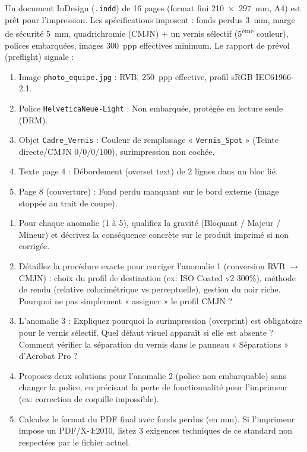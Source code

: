 \documentclass[11pt]{article}
\begin{document}
\begin{exercice}
Un document InDesign (\texttt{.indd}) de 16 pages (format fini \SI{210 x 297}{\milli\meter}, A4) est prêt pour l'impression. Les spécifications imposent : fonds perdus \SI{3}{\milli\meter}, marge de sécurité \SI{5}{\milli\meter}, quadrichromie (CMJN) + un vernis sélectif (5\textsuperscript{ème} couleur), polices embarquées, images \SI{300}{ppp} effectives minimum. Le rapport de prévol (preflight) signale :
\begin{enumerate}
    \item Image \texttt{photo\_equipe.jpg} : RVB, \SI{250}{ppp} effective, profil sRGB IEC61966-2.1.
    \item Police \texttt{HelveticaNeue-Light} : Non embarquée, protégée en lecture seule (DRM).
    \item Objet \texttt{Cadre\_Vernis} : Couleur de remplissage « \texttt{Vernis\_Spot} » (Teinte directe/CMJN 0/0/0/100), surimpression non cochée.
    \item Texte page 4 : Débordement (overset text) de 2 lignes dans un bloc lié.
    \item Page 8 (couverture) : Fond perdu manquant sur le bord externe (image stoppée au trait de coupe).
\end{enumerate}
\begin{enumerate}
    \item Pour chaque anomalie (1 à 5), qualifiez la gravité (Bloquant / Majeur / Mineur) et décrivez la conséquence concrète sur le produit imprimé si non corrigée.
    \item Détaillez la procédure exacte pour corriger l'anomalie 1 (conversion RVB $\to$ CMJN) : choix du profil de destination (ex: ISO Coated v2 300\%), méthode de rendu (relative colorimétrique vs perceptuelle), gestion du noir riche. Pourquoi ne pas simplement « assigner » le profil CMJN ?
    \item L'anomalie 3 : Expliquez pourquoi la surimpression (overprint) est obligatoire pour le vernis sélectif. Quel défaut visuel apparaît si elle est absente ? Comment vérifier la séparation du vernis dans le panneau « Séparations » d'Acrobat Pro ?
    \item Proposez deux solutions pour l'anomalie 2 (police non embarquable) sans changer la police, en précisant la perte de fonctionnalité pour l'imprimeur (ex: correction de coquille impossible).
    \item Calculez le format du PDF final avec fonds perdus (en mm). Si l'imprimeur impose un PDF/X-4:2010, listez 3 exigences techniques de ce standard non respectées par le fichier actuel.
\end{enumerate}
\end{exercice}
\end{document}
